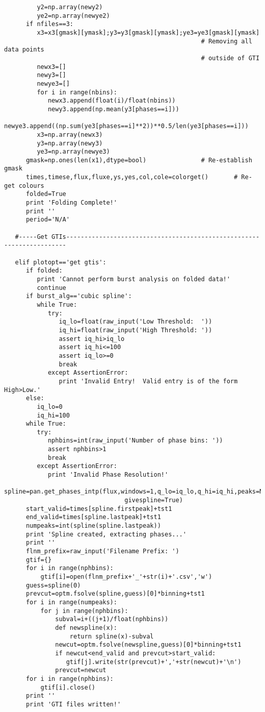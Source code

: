 \begin{verbatim}
         y2=np.array(newy2)
         ye2=np.array(newye2)
      if nfiles==3:
         x3=x3[gmask][ymask];y3=y3[gmask][ymask];ye3=ye3[gmask][ymask]
                                                      # Removing all data points
                                                      # outside of GTI
         newx3=[]
         newy3=[]
         newye3=[]
         for i in range(nbins):
            newx3.append(float(i)/float(nbins))
            newy3.append(np.mean(y3[phases==i]))
            newye3.append((np.sum(ye3[phases==i]**2))**0.5/len(ye3[phases==i]))
         x3=np.array(newx3)
         y3=np.array(newy3)
         ye3=np.array(newye3)
      gmask=np.ones(len(x1),dtype=bool)               # Re-establish gmask
      times,timese,flux,fluxe,ys,yes,col,cole=colorget()       # Re-get colours
      folded=True
      print 'Folding Complete!'
      print ''
      period='N/A'

   #-----Get GTIs----------------------------------------------------------------------

   elif plotopt=='get gtis':
      if folded:
         print 'Cannot perform burst analysis on folded data!'
         continue
      if burst_alg=='cubic spline':
         while True:
            try:
               iq_lo=float(raw_input('Low Threshold:  '))
               iq_hi=float(raw_input('High Threshold: '))
               assert iq_hi>iq_lo
               assert iq_hi<=100
               assert iq_lo>=0
               break
            except AssertionError:
               print 'Invalid Entry!  Valid entry is of the form High>Low.'
      else:
         iq_lo=0
         iq_hi=100
      while True:
         try:
            nphbins=int(raw_input('Number of phase bins: '))
            assert nphbins>1
            break
         except AssertionError:
            print 'Invalid Phase Resolution!'
      spline=pan.get_phases_intp(flux,windows=1,q_lo=iq_lo,q_hi=iq_hi,peaks=None,
                                 givespline=True)
      start_valid=times[spline.firstpeak]+tst1
      end_valid=times[spline.lastpeak]+tst1
      numpeaks=int(spline(spline.lastpeak))
      print 'Spline created, extracting phases...'
      print ''
      flnm_prefix=raw_input('Filename Prefix: ')
      gtif={}
      for i in range(nphbins):
          gtif[i]=open(flnm_prefix+'_'+str(i)+'.csv','w')
      guess=spline(0)          
      prevcut=optm.fsolve(spline,guess)[0]*binning+tst1
      for i in range(numpeaks):
          for j in range(nphbins):
              subval=i+((j+1)/float(nphbins))
              def newspline(x):
                  return spline(x)-subval
              newcut=optm.fsolve(newspline,guess)[0]*binning+tst1
              if newcut<end_valid and prevcut>start_valid:
                 gtif[j].write(str(prevcut)+','+str(newcut)+'\n')
              prevcut=newcut     
      for i in range(nphbins):
          gtif[i].close()
      print ''
      print 'GTI files written!'


\end{verbatim}
